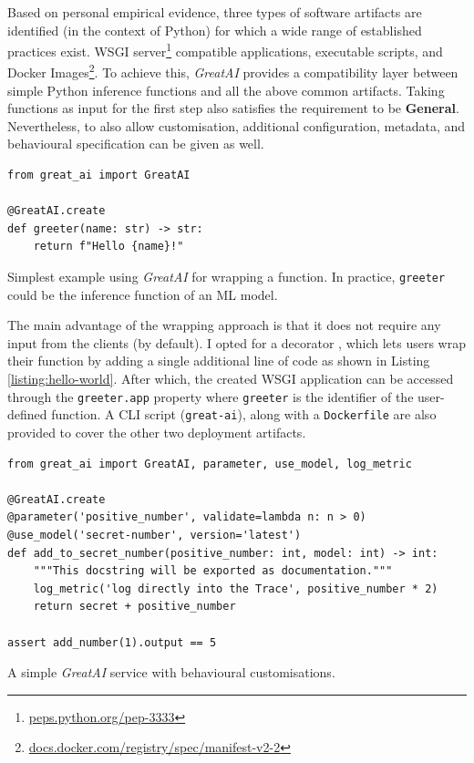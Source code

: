 Based on personal empirical evidence, three types of software artifacts are identified (in the context of Python) for which a wide range of established practices exist. WSGI server\footnote{\href{https://peps.python.org/pep-3333/}{peps.python.org/pep-3333}} compatible applications, executable scripts, and Docker Images\footnote{\href{https://docs.docker.com/registry/spec/manifest-v2-2/}{docs.docker.com/registry/spec/manifest-v2-2}}. To achieve this, \textit{GreatAI} provides a compatibility layer between simple Python inference functions and all the above common artifacts. Taking functions as input for the first step also satisfies the requirement to be \textbf{General}. Nevertheless, to also allow customisation, additional configuration, metadata, and behavioural specification can be given as well.

\begin{listing}[!ht]
\begin{verbatim}
from great_ai import GreatAI

@GreatAI.create
def greeter(name: str) -> str:
    return f"Hello {name}!"
\end{verbatim}
\captionsetup{width=.9\linewidth}
\caption{Simplest example using \textit{GreatAI} for wrapping a function. In practice, \texttt{greeter} could be the inference function of an ML model.}
\label{listing:hello-world}
\end{listing}

The main advantage of the wrapping approach is that it does not require any input from the clients (by default). I opted for a decorator \cite{gamma1995design}, which lets users wrap their function by adding a single additional line of code as shown in Listing \ref{listing:hello-world}. After which, the created WSGI application can be accessed through the \texttt{greeter.app} property where \texttt{greeter} is the identifier of the user-defined function. A CLI script (\texttt{great-ai}), along with a \texttt{Dockerfile} are also provided to cover the other two deployment artifacts.


\begin{listing}[!ht]
\begin{verbatim}
from great_ai import GreatAI, parameter, use_model, log_metric

@GreatAI.create
@parameter('positive_number', validate=lambda n: n > 0)
@use_model('secret-number', version='latest')
def add_to_secret_number(positive_number: int, model: int) -> int:
    """This docstring will be exported as documentation."""
    log_metric('log directly into the Trace', positive_number * 2)
    return secret + positive_number

assert add_number(1).output == 5
\end{verbatim}
\captionsetup{width=.9\linewidth,position=top,skip=-20pt}
\caption{A simple \textit{GreatAI} service with behavioural customisations.}
\label{listing:complex}
\end{listing}

